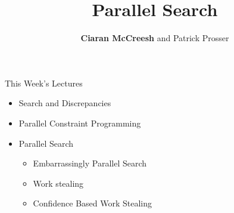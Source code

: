 \documentclass{beamer}
\title{Parallel Search}
\author[Ciaran McCreesh and Patrick Prosser]{\textbf{Ciaran McCreesh} and Patrick Prosser}
\begin{document}
{
    \begin{frame}
        \titlepage
    \end{frame}
}

\begin{frame}{This Week's Lectures}
    \begin{itemize}
        \item Search and Discrepancies
        \item Parallel Constraint Programming
        \item \textcolor{uofgcobalt}{Parallel Search}
            \begin{itemize}
                \item Embarrassingly Parallel Search
                \item Work stealing
                \item Confidence Based Work Stealing
            \end{itemize}
    \end{itemize}
\end{frame}
\end{document}
